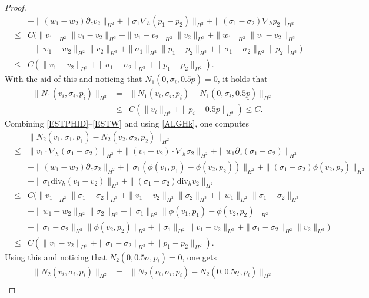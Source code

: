 \documentclass[12pt,reqno]{amsart}
\numberwithin{equation}{section}
\begin{document}
\begin{proof}
\begin{eqnarray*}
  &&+\|(w_1-w_2)\partial_zv_2\|_{H^2}+\|\sigma_1\nabla_h(p_1-p_2)\|_{H^2}+\|(\sigma_1-\sigma_2)\nabla_hp_2\|_{H^2}\nonumber\\
  &\leq&C(\|v_1\|_{H^2}\|v_1-v_2\|_{H^3}+\|v_1-v_2\|_{H^2}\|v_2\|_{H^3}+\|w_1\|_{H^2}\|v_1-v_2\|_{H^3}\nonumber\\
  &&+\|w_1-w_2\|_{H^2}\|v_2\|_{H^3}+\|\sigma_1\|_{H^2}\|p_1-p_2\|_{H^3}+\|\sigma_1-\sigma_2\|_{H^2}\|p_2\|_{H^3})\nonumber\\
  &\leq&C(\|v_1-v_2\|_{H^3}+\|\sigma_1-\sigma_2\|_{H^3}+\|p_1-p_2\|_{H^2}).
\end{eqnarray*}
With the aid of this and noticing that $N_1(0,\sigma_i,0.5\underline p)=0$, it holds that
\begin{eqnarray*}
  \|N_1(v_i,\sigma_i,p_i)\|_{H^2}&=&\|N_1(v_i,\sigma_i,p_i)-N_1(0,\sigma_i,0.5\underline p)\|_{H^2}\nonumber\\
  &\leq&C(\|v_i\|_{H^3}+\|p_i-0.5\underline p\|_{H^3})\leq C.
\end{eqnarray*}
Combining \eqref{ESTPHID}--\eqref{ESTW} and using \eqref{ALGHk}, one computes
\begin{eqnarray*}
  &&\|N_2(v_1,\sigma_1,p_1)-N_2(v_2,\sigma_2,p_2)\|_{H^2}\\
  &\leq&\|v_1\cdot\nabla_h(\sigma_1-\sigma_2)\|_{H^2}+\|(v_1-v_2)\cdot\nabla_h\sigma_2\|_{H^2}+\|w_1\partial_z(\sigma_1-\sigma_2)\|_{H^2}\\
  &&+\|(w_1-w_2)\partial_z\sigma_2\|_{H^2}+\|\sigma_1(\phi(v_1,p_1)-\phi(v_2,p_2))\|_{H^2}+\|(\sigma_1-\sigma_2)\phi(v_2,p_2)\|_{H^2}\\
  &&+\|\sigma_1\text{div}_h(v_1-v_2)\|_{H^2}+\|(\sigma_1-\sigma_2)\text{div}_hv_2\|_{H^2}\\
   &\leq&C(\|v_1\|_{H^2}\|\sigma_1-\sigma_2\|_{H^3}+\|v_1-v_2\|_{H^2}\|\sigma_2\|_{H^3}+\|w_1\|_{H^2}\|\sigma_1-\sigma_2\|_{H^3}\\
  &&+\|w_1-w_2\|_{H^2}\|\sigma_2\|_{H^3}+\|\sigma_1\|_{H^2}\|\phi(v_1,p_1)-\phi(v_2,p_2)\|_{H^2}\\
  &&+\|\sigma_1-\sigma_2\|_{H^2}\|\phi(v_2,p_2)\|_{H^2}+\|\sigma_1\|_{H^2}\|v_1-v_2\|_{H^3}+\|\sigma_1-\sigma_2\|_{H^2}\|v_2\|_{H^3})\\
   &\leq&C(\|v_1-v_2\|_{H^3}+\|\sigma_1-\sigma_2\|_{H^3}+\|p_1-p_2\|_{H^2}).
\end{eqnarray*}
Using this and noticing that $N_2(0,0.5\underline\sigma,p_i)=0$, one gets
\begin{eqnarray*}
  \|N_2(v_i,\sigma_i,p_i)\|_{H^2}&=&\|N_2(v_i,\sigma_i,p_i)-N_2(0,0.5\underline\sigma,p_i)\|_{H^2}\\

\end{eqnarray*}
\end{proof}
\end{document}
